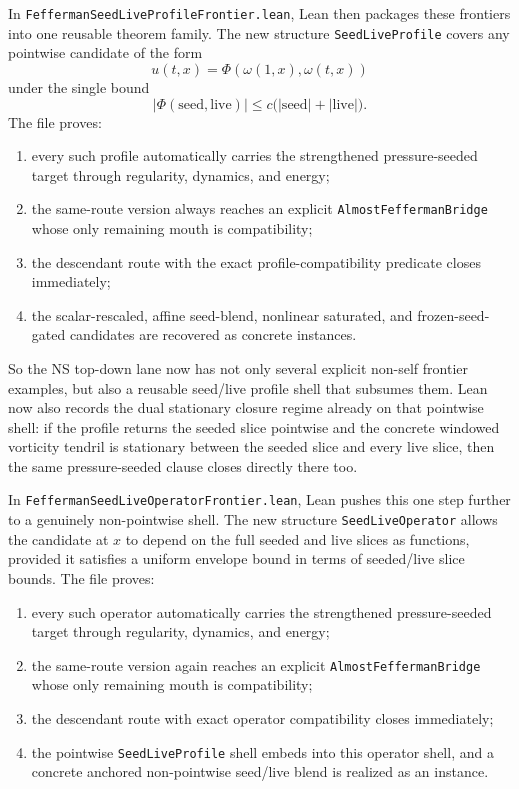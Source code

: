 \documentclass[11pt]{article}
\begin{document}
In \texttt{FeffermanSeedLiveProfileFrontier.lean}, Lean then packages these
frontiers into one reusable theorem family.  The new structure
\texttt{SeedLiveProfile} covers any pointwise candidate of the form
\[
u(t,x) = \Phi(\omega(1,x), \omega(t,x))
\]
under the single bound
\[
|\Phi(\mathrm{seed},\mathrm{live})|
  \le c \bigl(|\mathrm{seed}| + |\mathrm{live}|\bigr).
\]
The file proves:
\begin{enumerate}[leftmargin=1.5em]
  \item every such profile automatically carries the strengthened
  pressure-seeded target through regularity, dynamics, and energy;
  \item the same-route version always reaches an explicit
  \texttt{AlmostFeffermanBridge} whose only remaining mouth is compatibility;
  \item the descendant route with the exact profile-compatibility predicate
  closes immediately;
  \item the scalar-rescaled, affine seed-blend, nonlinear saturated, and
  frozen-seed-gated candidates are recovered as concrete instances.
\end{enumerate}

So the NS top-down lane now has not only several explicit non-self frontier
examples, but also a reusable seed/live profile shell that subsumes them.
Lean now also records the dual stationary closure regime already on that
pointwise shell: if the profile returns the seeded slice pointwise and the
concrete windowed vorticity tendril is stationary between the seeded slice and
every live slice, then the same pressure-seeded clause closes directly there
too.

In \texttt{FeffermanSeedLiveOperatorFrontier.lean}, Lean pushes this one step
further to a genuinely non-pointwise shell.  The new structure
\texttt{SeedLiveOperator} allows the candidate at \(x\) to depend on the full
seeded and live slices as functions, provided it satisfies a uniform envelope
bound in terms of seeded/live slice bounds.  The file proves:
\begin{enumerate}[leftmargin=1.5em]
  \item every such operator automatically carries the strengthened
  pressure-seeded target through regularity, dynamics, and energy;
  \item the same-route version again reaches an explicit
  \texttt{AlmostFeffermanBridge} whose only remaining mouth is compatibility;
  \item the descendant route with exact operator compatibility closes
  immediately;
  \item the pointwise \texttt{SeedLiveProfile} shell embeds into this operator
  shell, and a concrete anchored non-pointwise seed/live blend is realized as
  an instance.
\end{enumerate}
\end{document}
